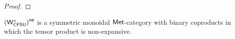 \begin{proof}

\end{proof}



\begin{theorem}
  $\left(\mathsf{W^*_{CPSU}}\right)^{\mathsf{op}}$ is a symmetric monoidal $\mathsf{Met}$-category with binary coproducts in which the tensor product is non-expansive. 
\end{theorem}

